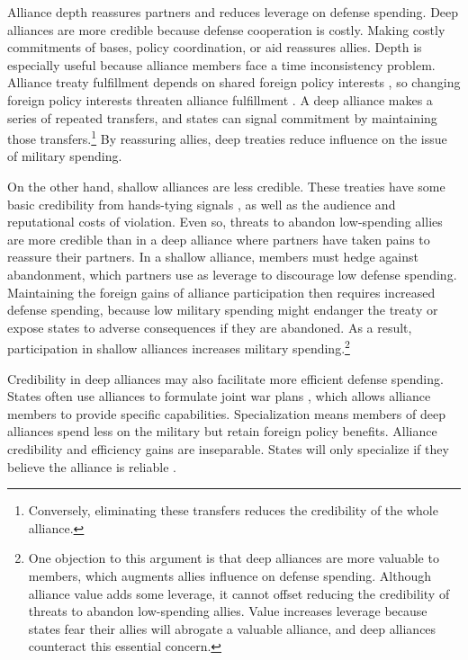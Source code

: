 \documentclass[12pt]{article}
\begin{document}
Alliance depth reassures partners and reduces leverage on defense spending.  
Deep alliances are more credible because defense cooperation is costly. 
Making costly commitments of bases, policy coordination, or aid reassures allies. 
Depth is especially useful because alliance members face a time inconsistency problem. 
Alliance treaty fulfillment depends on shared foreign policy interests \citep{Morrow2000, Leeds2003a}, so changing foreign policy interests threaten alliance fulfillment \citep{LeedsSavun2007}. 
A deep alliance makes a series of repeated transfers, and states can signal commitment by maintaining those transfers.\footnote{Conversely, eliminating these transfers reduces the credibility of the whole alliance.} 
By reassuring allies, deep treaties reduce influence on the issue of military spending. 


On the other hand, shallow alliances are less credible. 
These treaties have some basic credibility from hands-tying signals \citep{Fearon1997}, as well as the audience \cite{Morrow2000} and reputational \citep{Gibler2008, Crescenzietal2012} costs of violation.
Even so, threats to abandon low-spending allies are more credible than in a deep alliance where partners have taken pains to reassure their partners.  
In a shallow alliance, members must hedge against abandonment, which partners use as leverage to discourage low defense spending. 
Maintaining the foreign gains of alliance participation then requires increased defense spending, because low military spending might endanger the treaty or expose states to adverse consequences if they are abandoned. 
As a result, participation in shallow alliances increases military spending.\footnote{
One objection to this argument is that deep alliances are more valuable to members, which augments allies influence on defense spending. 
Although alliance value adds some leverage, it cannot offset reducing the credibility of threats to abandon low-spending allies.
Value increases leverage because states fear their allies will abrogate a valuable alliance, and deep alliances counteract this essential concern. 
}


Credibility in deep alliances may also facilitate more efficient defense spending. 
States often use alliances to formulate joint war plans \citep{Poast2019a}, which allows alliance members to provide specific capabilities. 
Specialization means members of deep alliances spend less on the military but retain foreign policy benefits.
Alliance credibility and efficiency gains are inseparable. 
States will only specialize if they believe the alliance is reliable \citep{Leeds2003a}.  
\end{document}
